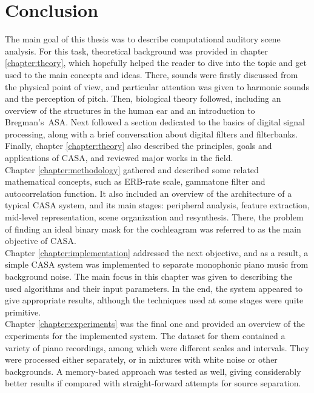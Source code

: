 \chapter{Conclusion}\label{chapter:conclusion}

The main goal of this thesis was to describe computational auditory scene analysis. For this task, theoretical background was provided in chapter \ref{chapter:theory}, which hopefully helped the reader to dive into the topic and get used to the main concepts and ideas. There, sounds were firstly discussed from the physical point of view, and particular attention was given to harmonic sounds and the perception of pitch. Then, biological theory followed, including an overview of the structures in the human ear and an introduction to Bregman's~ASA. Next followed a section dedicated to the basics of digital signal processing, along with a brief conversation about digital filters and filterbanks. Finally, chapter \ref{chapter:theory} also described the principles, goals and applications of CASA, and reviewed major works in the field.\\

Chapter \ref{chapter:methodology} gathered and described some related mathematical concepts, such as ERB-rate scale, gammatone filter and autocorrelation function. It also included an overview of the architecture of a typical CASA system, and its main stages: peripheral analysis, feature extraction, mid-level representation, scene organization and resynthesis. There, the problem of finding an ideal binary mask for the cochleagram was referred to as the main objective of CASA.\\

Chapter \ref{chapter:implementation} addressed the next objective, and as a result, a simple CASA system was implemented to separate monophonic piano music from background noise. The main focus in this chapter was given to describing the used algorithms and their input parameters. In the end, the system appeared to give appropriate results, although the techniques used at some stages were quite primitive.\\

Chapter \ref{chapter:experiments} was the final one and provided an overview of the experiments for the implemented system. The dataset for them contained a variety of piano recordings, among which were diffe\-rent scales and intervals. They were processed either separately, or in mixtures with white noise or other backgrounds. A memory-based approach was tested as well, giving considerably better results if compared with straight-forward attempts for source separation.\\

